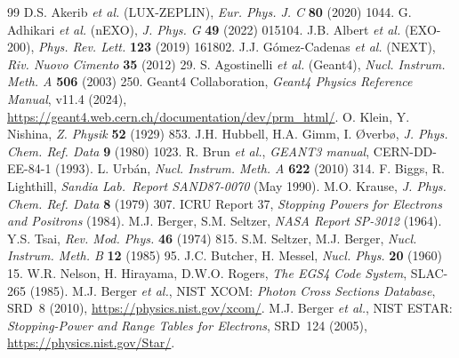 \documentclass[11pt,a4paper]{article}
\begin{document}
\begin{thebibliography}{99}\small\itemsep=2pt
 D.S. Akerib \emph{et al.} (LUX-ZEPLIN),
   \emph{Eur. Phys. J. C} \textbf{80} (2020) 1044.
 G. Adhikari \emph{et al.} (nEXO),
   \emph{J. Phys. G} \textbf{49} (2022) 015104.
 J.B. Albert \emph{et al.} (EXO-200),
   \emph{Phys. Rev. Lett.} \textbf{123} (2019) 161802.
 J.J. G\'omez-Cadenas \emph{et al.} (NEXT),
   \emph{Riv. Nuovo Cimento} \textbf{35} (2012) 29.
 S. Agostinelli \emph{et al.} (Geant4),
   \emph{Nucl. Instrum. Meth. A} \textbf{506} (2003) 250.
 Geant4 Collaboration,
   \emph{Geant4 Physics Reference Manual}, v11.4 (2024),
   \url{https://geant4.web.cern.ch/documentation/dev/prm_html/}.
 O. Klein, Y. Nishina,
   \emph{Z. Physik} \textbf{52} (1929) 853.
 J.H. Hubbell, H.A. Gimm, I. \O{}verb\o{},
   \emph{J. Phys. Chem. Ref. Data} \textbf{9} (1980) 1023.
 R. Brun \emph{et al.}, \emph{GEANT3 manual},
   CERN-DD-EE-84-1 (1993).
 L. Urb\'an,
   \emph{Nucl. Instrum. Meth. A} \textbf{622} (2010) 314.
 F. Biggs, R. Lighthill,
   \emph{Sandia Lab.\ Report SAND87-0070} (May 1990).
 M.O. Krause,
   \emph{J. Phys. Chem. Ref. Data} \textbf{8} (1979) 307.
 ICRU Report 37, \emph{Stopping Powers for
   Electrons and Positrons} (1984).
 M.J. Berger, S.M. Seltzer,
   \emph{NASA Report SP-3012} (1964).
 Y.S. Tsai,
   \emph{Rev. Mod. Phys.} \textbf{46} (1974) 815.
 S.M. Seltzer, M.J. Berger,
   \emph{Nucl. Instrum. Meth. B} \textbf{12} (1985) 95.
 J.C. Butcher, H. Messel,
   \emph{Nucl. Phys.} \textbf{20} (1960) 15.
 W.R. Nelson, H. Hirayama, D.W.O. Rogers,
   \emph{The EGS4 Code System}, SLAC-265 (1985).
 M.J. Berger \emph{et al.}, NIST XCOM:
   \emph{Photon Cross Sections Database}, SRD~8 (2010),
   \url{https://physics.nist.gov/xcom/}.
 M.J. Berger \emph{et al.}, NIST ESTAR:
   \emph{Stopping-Power and Range Tables for Electrons},
   SRD~124 (2005), \url{https://physics.nist.gov/Star/}.
\end{thebibliography}
\end{document}
